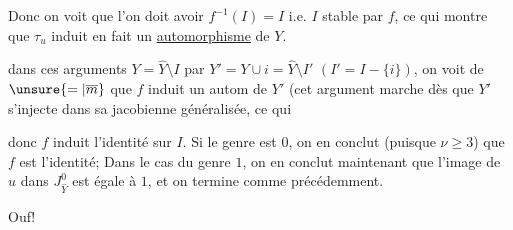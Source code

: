 

 Donc on voit que l'on doit avoir $f^{-1}(I)=I$ i.e. $I$ stable par $f$, ce qui montre que $\tau_u$ induit en fait un \uline{automorphisme} de $Y$.


dans ces arguments $Y=\widehat Y\setminus I$ par $Y'=Y\cup i=\widehat Y\setminus I'$ $(I'=I-\{i\})$, on voit de $\unsure{=|\overline m}$ que $f$ induit un autom de $Y'$ (cet argument marche dès que $Y'$ s'injecte dans sa jacobienne généralisée, ce qui  

 donc $f$ induit l'identité sur $I$. Si le genre est $0$, on en conclut (puisque $\nu\geq3$) que $f$ est l'identité;  Dans le cas du genre $1$, on en conclut maintenant que l'image de $u$ dans $J_{\widehat Y}^0$ est égale à $1$, et on termine comme précédemment.

Ouf!
